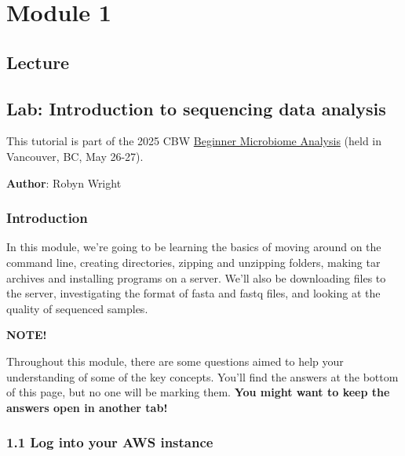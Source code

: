 \documentclass[
]{book}
\newenvironment{bluebox}{
  \definecolor{shadecolor}{RGB}{172, 210, 237}
  \color{white}
  \begin{shaded}}
 {\end{shaded}}
\begin{document}
\chapter{Module 1}\label{module-1}

\section{Lecture}\label{lecture}

\section{Lab: Introduction to sequencing data analysis}\label{lab-introduction-to-sequencing-data-analysis}

This tutorial is part of the 2025 CBW \href{https://bioinformaticsdotca.github.io/BMB_2025/}{Beginner Microbiome Analysis} (held in Vancouver, BC, May 26-27).

\textbf{Author}: Robyn Wright

\subsection{Introduction}\label{introduction}

In this module, we're going to be learning the basics of moving around on the command line, creating directories, zipping and unzipping folders, making tar archives and installing programs on a server. We'll also be downloading files to the server, investigating the format of fasta and fastq files, and looking at the quality of sequenced samples.

\begin{bluebox}

\begin{center}
\textbf{NOTE!}

\end{center}

Throughout this module, there are some questions aimed to help your understanding of some of the key concepts. You'll find the answers at the bottom of this page, but no one will be marking them. \textbf{You might want to keep the answers open in another tab!}

\end{bluebox}

\subsection{1.1 Log into your AWS instance}\label{log-into-your-aws-instance}
\end{document}
